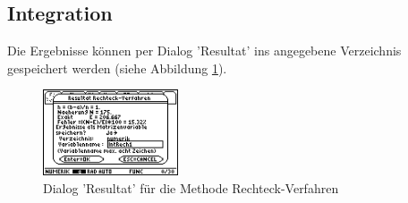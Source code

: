 \documentclass[
	a4paper							%
	,12pt							%
	,twoside						%
	,openright						%
]{scrreprt}							%
\begin{document}
\subsection{Integration}
Die Ergebnisse k\"onnen per Dialog 'Resultat’ ins angegebene Verzeichnis gespeichert werden (siehe Abbildung \ref{fig:ResultatIntegrationRechteck}).
\begin{figure}[h]
  \centering
  \includegraphics[width=4cm]{img/nummeth_image040.png}
  \caption{Dialog 'Resultat' f\"ur die Methode Rechteck-Verfahren}
  \label{fig:ResultatIntegrationRechteck}
\end{figure}

\end{document}
